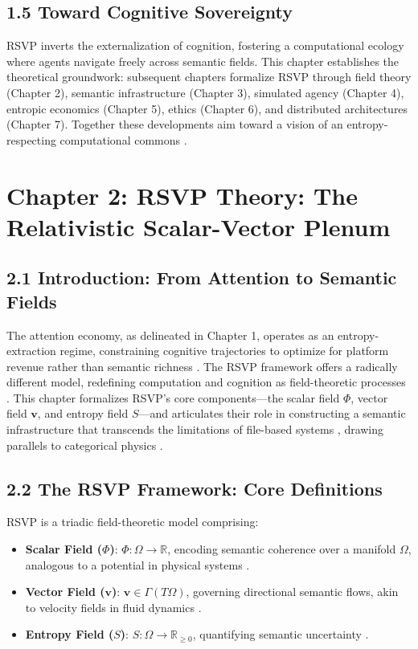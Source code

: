 \documentclass[12pt]{article}
\begin{document}
\subsection*{1.5 Toward Cognitive Sovereignty}

RSVP inverts the externalization of cognition, fostering a computational ecology where agents navigate freely across semantic fields. This chapter establishes the theoretical groundwork: subsequent chapters formalize RSVP through field theory (Chapter 2), semantic infrastructure (Chapter 3), simulated agency (Chapter 4), entropic economics (Chapter 5), ethics (Chapter 6), and distributed architectures (Chapter 7). Together these developments aim toward a vision of an entropy-respecting computational commons \citep{atiyah1969, milewski2018}.

\section*{Chapter 2: RSVP Theory: The Relativistic Scalar-Vector Plenum}

\subsection*{2.1 Introduction: From Attention to Semantic Fields}

The attention economy, as delineated in Chapter 1, operates as an entropy-extraction regime, constraining cognitive trajectories to optimize for platform revenue rather than semantic richness \citep{zuboff2019, lanier2018}. The RSVP framework offers a radically different model, redefining computation and cognition as field-theoretic processes \citep{gromov1999}. This chapter formalizes RSVP’s core components—the scalar field \(\Phi\), vector field \(\mathbf{v}\), and entropy field \(S\)—and articulates their role in constructing a semantic infrastructure that transcends the limitations of file-based systems \citep{bird1988}, drawing parallels to categorical physics \citep{baez2011}.

\subsection*{2.2 The RSVP Framework: Core Definitions}

RSVP is a triadic field-theoretic model comprising:
\begin{itemize}
    \item \textbf{Scalar Field (\(\Phi\))}: \(\Phi: \Omega \to \mathbb{R}\), encoding semantic coherence over a manifold \(\Omega\), analogous to a potential in physical systems \citep{gromov1999}.
    \item \textbf{Vector Field (\(\mathbf{v}\))}: \(\mathbf{v} \in \Gamma(T\Omega)\), governing directional semantic flows, akin to velocity fields in fluid dynamics \citep{baez2011}.
    \item \textbf{Entropy Field (\(S\))}: \(S: \Omega \to \mathbb{R}_{\geq 0}\), quantifying semantic uncertainty \citep{shannon1948}.
\end{itemize}
\end{document}
